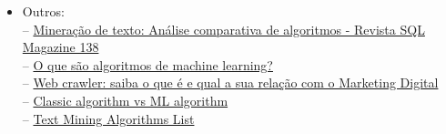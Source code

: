 \documentclass[a4paper,10pt]{article}
\begin{document}
\begin{itemize}
  \item Outros:
  \\ -- \href{https://www.devmedia.com.br/mineracao-de-texto-analise-comparativa-de-algoritmos-revista-sql-magazine-138/34013}{Mineração de texto: Análise comparativa de algoritmos - Revista SQL Magazine 138}
  \\ -- \href{https://azure.microsoft.com/pt-pt/overview/machine-learning-algorithms/#overview}{O que são algoritmos de machine learning?}
  \\ -- \href{https://rockcontent.com/br/blog/web-crawler/}{Web crawler: saiba o que é e qual a sua relação com o Marketing Digital}
  \\ -- \href{https://www.geekboots.com/story/classic-algorithm-vs-ml-algorithm}{Classic algorithm vs ML algorithm}
  \\ -- \href{https://www.intellspot.com/text-mining-algorithms/}{Text Mining Algorithms List}
\end{itemize}
\end{document}
